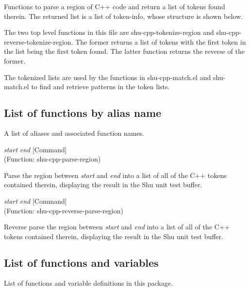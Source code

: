 Functions to parse a region of C++ code and return a list of tokens
found therein.  The returned list is a list of token-info, whose structure
is shown below.

The two top level functions in this file are shu-cpp-tokenize-region and
shu-cpp-reverse-tokenize-region.  The former returns a list of tokens with the
first token in the list being the first token found.  The latter function
returns the reverse of the former.

The tokenized lists are used by the functions in shu-cpp-match.el and
shu-match.el to find and retrieve patterns in the token lists.


\subsection{List of functions by alias name}

A list of aliases and associated function names.



\vspace{1em}
\noindent
{}
\usebox{\funcname}\emph{start} \emph{end}
 \hfill [Command]\\%
 (Function: shu-cpp-parse-region)

\begin{doc-string}
Parse the region between \emph{start} and \emph{end} into a list of all of the C++ tokens
contained therein, displaying the result in the Shu unit test buffer.
\end{doc-string}

\vspace{1em}
\noindent
{}
\usebox{\funcname}\emph{start} \emph{end}
 \hfill [Command]\\%
 (Function: shu-cpp-reverse-parse-region)

\begin{doc-string}
Reverse parse the region between \emph{start} and \emph{end} into a list of all of the C++
tokens contained therein, displaying the result in the Shu unit test buffer.
\end{doc-string}

\subsection{List of functions and variables}

List of functions and variable definitions in this package.



